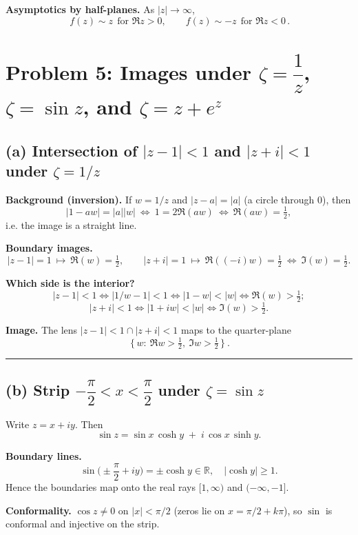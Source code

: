 \documentclass[11pt]{article}
\begin{document}
	\textbf{Asymptotics by half-planes.}
	As \(|z|\to\infty\),
	\[
	\boxed{\,f(z)\sim z\ \ \text{for }\Re z>0,\qquad f(z)\sim -z\ \ \text{for }\Re z<0\, }.
	\]
	
	\section{Problem 5: Images under $\zeta=\dfrac1z$, $\zeta=\sin z$, and $\zeta=z+e^{z}$}
	
	\subsection*{(a) Intersection of $|z-1|<1$ and $|z+i|<1$ under $\zeta=1/z$}
	
	\textbf{Background (inversion).}
	If $w=1/z$ and $|z-a|=|a|$ (a circle through $0$), then
	\[
	|1-aw|=|a||w|\ \Longleftrightarrow\ 1=2\Re(aw)\ \Longleftrightarrow\ \Re(aw)=\tfrac12,
	\]
	i.e. the image is a straight line.
	
	\textbf{Boundary images.}
	\[
	|z-1|=1 \ \longmapsto\ \Re(w)=\tfrac12,\qquad
	|z+i|=1 \ \longmapsto\ \Re((-i)w)=\tfrac12\ \Longleftrightarrow\ \Im(w)=\tfrac12 .
	\]
	
	\textbf{Which side is the interior?}
	\[
	|z-1|<1 \iff |1/w-1|<1 \iff |1-w|<|w|\iff \Re(w)>\tfrac12;
	\]
	\[
	|z+i|<1 \iff |1+iw|<|w|\iff \Im(w)>\tfrac12.
	\]
	
	\textbf{Image.} The lens $|z-1|<1\cap|z+i|<1$ maps to the quarter-plane
	\[
	\boxed{\ \{\,w:\ \Re w>\tfrac12,\ \Im w>\tfrac12\,\}\ }.
	\]
	
	\bigskip\hrule\bigskip
	
	\subsection*{(b) Strip $-\dfrac{\pi}{2}<x<\dfrac{\pi}{2}$ under $\zeta=\sin z$}
	
	Write $z=x+iy$. Then
	\[
	\sin z=\sin x\,\cosh y \;+\; i\,\cos x\,\sinh y.
	\]
	
	\textbf{Boundary lines.}
	\[
	\sin\!\Big(\pm \frac{\pi}{2}+iy\Big)=\pm \cosh y\in\mathbb{R},\quad |\cosh y|\ge1.
	\]
	Hence the boundaries map onto the real rays $[1,\infty)$ and $(-\infty,-1]$.
	
	\textbf{Conformality.}
	$\cos z\neq 0$ on $|x|<\pi/2$ (zeros lie on $x=\pi/2+k\pi$), so $\sin$ is conformal and injective on the strip.
	
\end{document}

